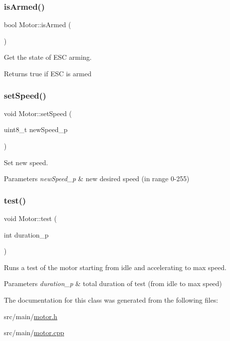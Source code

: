 \subsubsection{\texorpdfstring{is\+Armed()}{isArmed()}}
{\footnotesize\ttfamily bool Motor\+::is\+Armed (\begin{DoxyParamCaption}{ }\end{DoxyParamCaption})}



Get the state of E\+SC arming. 

\begin{DoxyReturn}{Returns}
true if E\+SC is armed 
\end{DoxyReturn}
\mbox{\label{class_motor_a0d852462f8afab5d980d2507d1915447}} 
\subsubsection{\texorpdfstring{set\+Speed()}{setSpeed()}}
{\footnotesize\ttfamily void Motor\+::set\+Speed (\begin{DoxyParamCaption}\item[{uint8\+\_\+t}]{new\+Speed\+\_\+p }\end{DoxyParamCaption})}



Set new speed. 


\begin{DoxyParams}{Parameters}
{\em new\+Speed\+\_\+p} & new desired speed (in range 0-\/255) \\
\hline
\end{DoxyParams}
\mbox{\label{class_motor_a0c2e15bba82f033dafb3b45ea874692f}} 
\subsubsection{\texorpdfstring{test()}{test()}}
{\footnotesize\ttfamily void Motor\+::test (\begin{DoxyParamCaption}\item[{int}]{duration\+\_\+p }\end{DoxyParamCaption})}



Runs a test of the motor starting from idle and accelerating to max speed. 


\begin{DoxyParams}{Parameters}
{\em duration\+\_\+p} & total duration of test (from idle to max speed) \\
\hline
\end{DoxyParams}


The documentation for this class was generated from the following files\+:\begin{DoxyCompactItemize}
\item 
src/main/\hyperlink{motor_8h}{motor.\+h}\item 
src/main/\hyperlink{motor_8cpp}{motor.\+cpp}\end{DoxyCompactItemize}

